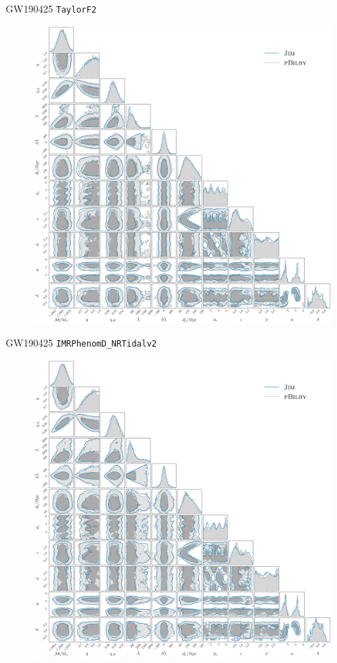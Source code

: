 \documentclass[usenames,dvipsnames,t]{beamer}
\begin{document}
\begin{frame}{GW190425 \texttt{TaylorF2}}
  \vspace{-4.5mm}
  \begin{figure}
    \centering
    \includegraphics[scale = 0.132]{Figures/GW190425_TaylorF2.pdf}
  \end{figure}
\end{frame}

\begin{frame}{GW190425 \texttt{IMRPhenomD\_NRTidalv2}}
  \vspace{-4.5mm}
  \begin{figure}
    \centering
    \includegraphics[scale = 0.132]{Figures/GW190425_NRTidalv2.pdf}
  \end{figure}
\end{frame}
\end{document}

